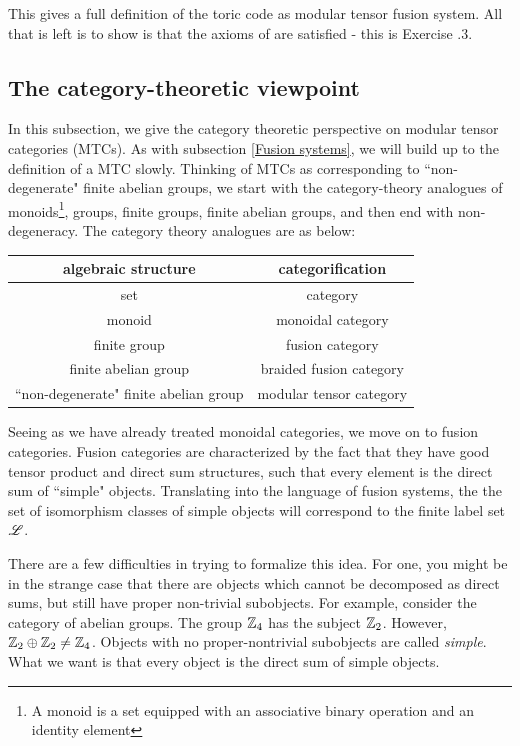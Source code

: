 \documentclass{article}
\theoremstyle{definition}
\numberwithin{figure}{section}
\begin{document}
This gives a full definition of the toric code as modular tensor fusion system. All that is left is to show is that the axioms of are satisfied - this is Exercise \thesection.3.


\subsection{The category-theoretic viewpoint}
\label{Category viewpoint}

In this subsection, we give the category theoretic perspective on modular tensor categories (MTCs). As with subsection \ref{Fusion systems}, we will build up to the definition of a MTC slowly. Thinking of MTCs as corresponding to ``non-degenerate" finite abelian groups, we start with the category-theory analogues of monoids\footnote{A monoid is a set equipped with an associative binary operation and an identity element}, groups, finite groups, finite abelian groups, and then end with non-degeneracy. The category theory analogues are as below:

\begin{center}
\begin{tabular}{c || c } 
  
algebraic structure & categorification \\
\hline
\hline
set & category \\ 
 \hline
monoid & monoidal category \\
 \hline
finite group &  fusion category \\
 \hline
finite abelian group & braided fusion category \\
\hline
``non-degenerate" finite abelian group & modular tensor category
\end{tabular}
\end{center}

Seeing as we have already treated monoidal categories, we move on to fusion categories. Fusion categories are characterized by the fact that they have good tensor product and direct sum structures, such that every element is the direct sum of ``simple" objects. Translating into the language of fusion systems, the the set of isomorphism classes of simple objects will correspond to the finite label set $\mathscr{L}$.

There are a few difficulties in trying to formalize this idea. For one, you might be in the strange case that there are objects which cannot be decomposed as direct sums, but still have proper non-trivial subobjects. For example, consider the category of abelian groups. The group $\mathbb{Z}_4$ has the subject $\mathbb{Z}_2$. However, $\mathbb{Z}_2\oplus\mathbb{Z}_2\neq \mathbb{Z}_4$. Objects with no proper-nontrivial subobjects are called \textit{simple}. What we want is that every object is the direct sum of simple objects.
\end{document}
